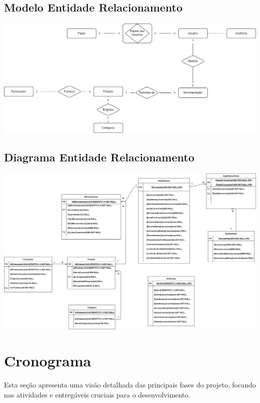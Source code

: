 \documentclass[
	12pt,				%
	openany,			%
	twoside,			%
	a4paper,			%
	english,			%
	brazil				%
	]{abntex2}
\begin{document}
\subsection{Modelo Entidade Relacionamento}

\includegraphics[width=1.0\textwidth]{Figuras/MERestoque.png}


\subsection{Diagrama Entidade Relacionamento}

\includegraphics[width=1.0\textwidth]{Figuras/DERestoque.png}



\section{Cronograma}

Esta seção apresenta uma visão detalhada das principais fases do projeto, focando nas atividades e entregáveis cruciais para o desenvolvimento.
\end{document}
